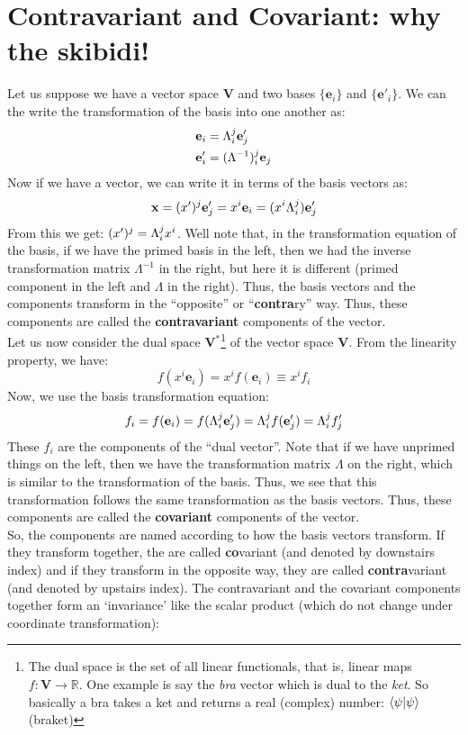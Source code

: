 \section{Contravariant and Covariant: why the skibidi!}
Let us suppose we have a vector space $\mathbf{V}$ and two bases $\{\mathbf{e}_i\}$ and $\{\mathbf{e}'_i\}$. We can the write the transformation of the basis into one another as:
\begin{align*}
    \mathbf{e}_i &= \tensor*{\Lambda}{^j_i}\mathbf{e}'_j\\
    \mathbf{e}'_i &= \tensor*{(\Lambda^{-1})}{_i^j}\mathbf{e}_j
\end{align*}
Now if we have a vector, we can write it in terms of the basis vectors as:
$$\mathbf{x} =  (x')^j \mathbf{e}'_j = x^i \mathbf{e}_i = (x^i \tensor*{\Lambda}{^j_i}) \mathbf{e}'_j $$
From this we get: $(x')^j = \tensor*{\Lambda}{^j_i} x^i$. Well note that, in the transformation equation of the basis, if we have the primed basis in the left, then we had the inverse transformation matrix $\Lambda^{-1}$ in the right, but here it is different (primed component in the left and $\Lambda$ in the right). Thus, the basis vectors and the components transform in the ``opposite'' or ``\textbf{contra}ry'' way. Thus, these components are called the \textbf{contravariant} components of the vector.\\[0.3cm]
Let us now consider the dual space $\mathbf{V}^*$\footnote{The dual space is the set of all linear functionals, that is, linear maps $f: \mathbf{V} \to \mathbb{R}$. One example is say the \textit{bra} vector which is dual to the \textit{ket}. So basically a bra takes a ket and returns a real (complex) number: $\braket{\psi|\psi}$ (braket)} of the vector space $\mathbf{V}$. From the linearity property, we have:
$$f(x^i\mathbf{e}_i) = x^i f(\mathbf{e}_i) \equiv x^i f_i$$
Now, we use the basis transformation equation:
$$f_i = f(\mathbf{e}_i) = f(\tensor*{\Lambda}{^j_i}\mathbf{e}'_j) = \tensor*{\Lambda}{^j_i}f(\mathbf{e}'_j) = \tensor*{\Lambda}{^j_i}f'_j$$
These $f_i$ are the components of the ``dual vector''. Note that if we have unprimed things on the left, then we have the transformation matrix $\Lambda$ on the right, which is similar to the transformation of the basis. Thus, we see that this transformation follows the same transformation as the basis vectors. Thus, these components are called the \textbf{covariant} components of the vector.\\[0.3cm]
So, the components are named according to how the basis vectors transform. If they transform together, the are called \textbf{co}variant (and denoted by downstairs index) and if they transform in the opposite way, they are called \textbf{contra}variant (and denoted by upstairs index). The contravariant and the covariant components together form an `invariance' like the scalar product (which do not change under coordinate transformation):
